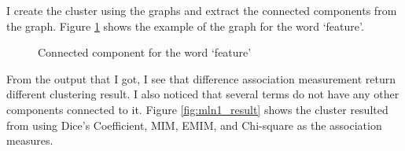 \documentclass[letterpaper,11pt]{article}
\begin{document}
I create the cluster using the graphs and extract the connected components from the graph. Figure \ref{fig:emim_graph_feature} shows the example of the graph for the word `feature'. 

\begin{figure}[H]
	\centering
	\caption{Connected component for the word `feature'}
	\label{fig:emim_graph_feature}
\end{figure}

From the output that I got, I see that difference association measurement return different clustering result. I also noticed that several terms do not have any other components connected to it. Figure \ref{fig:mln1_result} shows the cluster resulted from using Dice's Coefficient, MIM, EMIM, and Chi-square as the association measures. 
\end{document}
